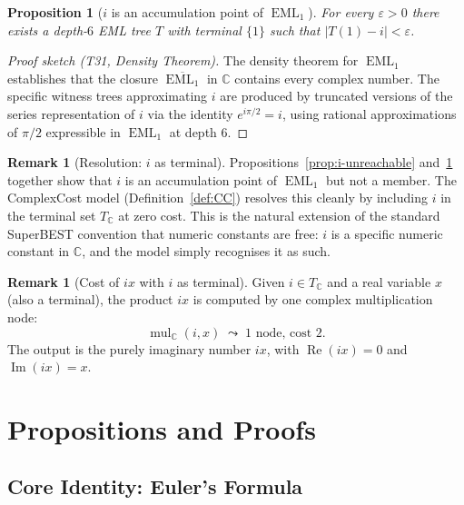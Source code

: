 \documentclass[12pt,a4paper]{article}
\newtheorem{proposition}[theorem]{Proposition}
\theoremstyle{definition}
\newtheorem{remark}[theorem]{Remark}
\newcommand{\EML}{\operatorname{EML}}
\begin{document}
\begin{proposition}[$i$ is an accumulation point of $\EML_1$]
\label{prop:i-density}
For every $\varepsilon > 0$ there exists a depth-$6$ EML tree $T$ with
terminal $\{1\}$ such that $|T(1) - i| < \varepsilon$.
\end{proposition}

\begin{proof}[Proof sketch (T31, Density Theorem)]
The density theorem for $\EML_1$ establishes that the closure
$\overline{\EML_1}$ in $\mathbb{C}$ contains every complex number.
The specific witness trees approximating $i$ are produced by truncated
versions of the series representation of $i$ via the identity
$e^{i\pi/2} = i$, using rational approximations of $\pi/2$ expressible in
$\EML_1$ at depth 6.
\end{proof}

\begin{remark}[Resolution: $i$ as terminal]
Propositions~\ref{prop:i-unreachable} and~\ref{prop:i-density} together show
that $i$ is an accumulation point of $\EML_1$ but not a member.
The ComplexCost model (Definition~\ref{def:CC}) resolves this cleanly by
including $i$ in the terminal set $T_{\mathbb{C}}$ at zero cost.
This is the natural extension of the standard SuperBEST convention that
numeric constants are free: $i$ is a specific numeric constant in
$\mathbb{C}$, and the model simply recognises it as such.
\end{remark}

\begin{remark}[Cost of $ix$ with $i$ as terminal]
Given $i \in T_{\mathbb{C}}$ and a real variable $x$ (also a terminal), the
product $ix$ is computed by one complex multiplication node:
\[
  \operatorname{mul}_{\mathbb{C}}(i, x) \;\leadsto\; \text{1 node, cost } 2.
\]
The output is the purely imaginary number $ix$, with
$\operatorname{Re}(ix) = 0$ and $\operatorname{Im}(ix) = x$.
\end{remark}

\section{Propositions and Proofs}
\label{sec:propositions}

\subsection{Core Identity: Euler's Formula}
\end{document}

